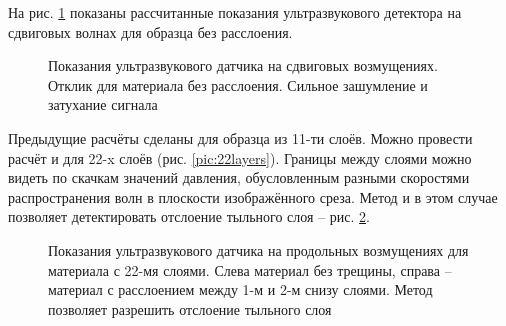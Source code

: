 На рис. \ref{pic:s-wave-detector} показаны рассчитанные показания ультразвукового детектора на сдвиговых волнах для образца без расслоения.
\begin{figure}%
	\caption{Показания ультразвукового датчика на сдвиговых возмущениях. Отклик для материала без расслоения. Сильное зашумление и затухание сигнала}
	\label{pic:s-wave-detector}
\end{figure}

Предыдущие расчёты сделаны для образца из 11-ти слоёв. Можно провести расчёт и для 22-x слоёв (рис. \ref{pic:22layers}). Границы между слоями можно видеть по скачкам значений давления, обусловленным разными скоростями распространения волн в плоскости изображённого среза. Метод и в этом случае позволяет детектировать отслоение тыльного слоя -- рис. \ref{pic:22-detector}.

\begin{figure}%
	\caption{Показания ультразвукового датчика на продольных возмущениях для материала с 22-мя слоями. Слева материал без трещины, справа -- материал с расслоением между 1-м и 2-м снизу слоями. Метод позволяет разрешить отслоение тыльного слоя}
	\label{pic:22-detector}
\end{figure}

